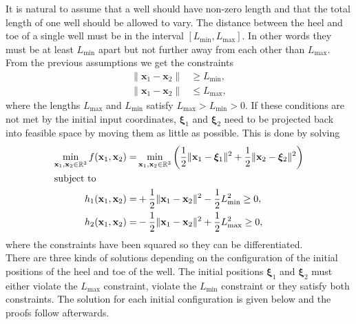 It is natural to assume that a well should have non-zero length
and that the total length of one well should be allowed to vary.
The distance between the heel and toe of a single well must be in the interval
$[L_{\min},L_{\max}]$. In other words they must be at least $L_{\min}$ apart
but not further away from each other than $L_{\max}$. From the previous assumptions
we get the constraints
%
\begin{equation}
\begin{aligned}
\| \textbf{x}_1 - \textbf{x}_2 \| &\geq L_{\min}, \\
\| \textbf{x}_1 - \textbf{x}_2 \| &\leq L_{\max}, 
\label{eq:well_length}
\end{aligned}
\end{equation}
%
where the lengths $L_{\max}$ and $L_{\min}$ satisfy $L_{\max} > L_{\min} > 0$.
If these conditions are not met by the initial input coordinates, $\boldsymbol{\xi}_{1}$ 
and $\boldsymbol{\xi}_{2}$ need to be projected back into feasible space by 
moving them as little as possible. This is done by solving
%
\begin{align}
	\min_{\textbf{x}_1,\textbf{x}_2 \in \mathbb{R}^3} f(\textbf{x}_1,\textbf{x}_2) =& \min_{\textbf{x}_1,\textbf{x}_2 \in \mathbb{R}^3}\left( \frac{1}{2} \| \textbf{x}_1 - \boldsymbol{\xi}_1 \|^2 + \frac{1}{2} \| \textbf{x}_2 - \boldsymbol{\xi}_2 \|^2 \right) \label{wlc_opt_1}\\
	 \intertext{subject to}																			
	h_1(\textbf{x}_1, \textbf{x}_2) =& +\frac{1}{2} \| \textbf{x}_1 - \textbf{x}_2 \|^2 - \frac{1}{2} L_{\min}^2 \geq 0, \label{wlc_opt_2}\\
    h_2(\textbf{x}_1, \textbf{x}_2) =& -\frac{1}{2} \| \textbf{x}_1 - \textbf{x}_2 \|^2 + \frac{1}{2} L_{\max}^2 \geq 0, \label{wlc_opt_3}
\end{align}
%
where the constraints have been squared so they can be differentiated.\\
%
There are three kinds of solutions depending on the configuration of the
initial positions of the heel and toe of the well. The initial positions $\boldsymbol{\xi}_1$
and $\boldsymbol{\xi}_2$ must either violate the $L_{\max}$ constraint, violate the
$L_{\min}$ constraint or they satisfy both constraints. The solution for each
initial configuration is given below and the proofs follow afterwards.\\
%
